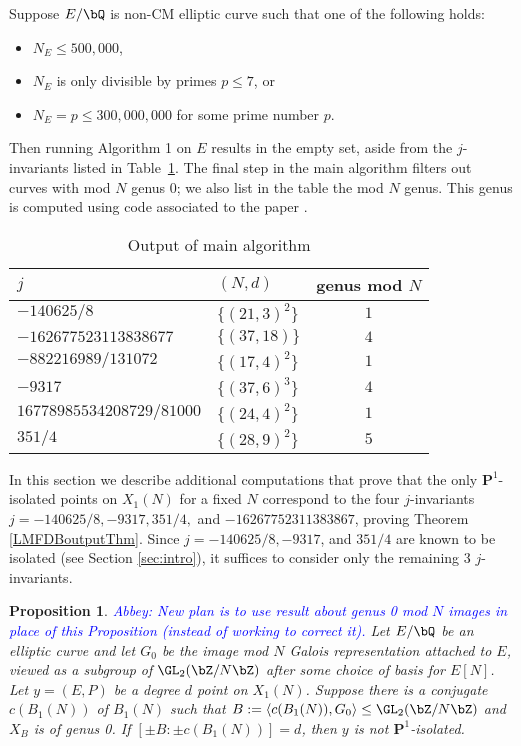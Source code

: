 \documentclass[11pt,reqno]{amsart}
\theoremstyle{plain}
\newtheorem{proposition}[theorem]{Proposition}
\theoremstyle{definition}
\newcommand{\Q}{\bQ}
\newcommand{\Z}{\bZ}
\newcommand{\PP}{\mathbf P}
\newcommand{\abbey}[1]{\textcolor{blue}{Abbey: #1}}
\begin{document}
Suppose $E/\Q$ is non-CM elliptic curve such that one of the following holds:
\begin{itemize}
    \item$N_E \leq 500{,}000$,
    \item $N_E$ is only divisible by primes $p \leq 7$, or
    \item $N_E=p \leq 300{,}000{,}000$ for some prime number $p$.
\end{itemize} Then running Algorithm 1 on $E$ results in the empty set, aside from the $j$-invariants listed in Table~\ref{table:imagegt0}. The final step in the main algorithm filters out curves with mod $N$ genus $0$; we also list in the table the mod $N$ genus.  This genus is computed using code associated to the paper \cite{RSZB2022}. 
	\begin{table}[h]
	\begin{center}
		\begin{tabularx}{266pt}{l l c} \toprule
		$j$ & $( N, d )$ & genus mod $N$  \\\midrule
$-140625/8$ &  $\{ ( 21, 3 )^2 \} $ & $1$\\
 $-162677523113838677$& $\{ ( 37, 18 ) \}$ & $4$\\
 $-882216989/131072$ & $\{ ( 17, 4 )^2\}$ & $1$ \\
 $-9317$ & $\{ ( 37, 6 )^3 \} $ & $4$\\
 $16778985534208729/81000$ & $\{ ( 24, 4 )^2 \}$ & $1$\\
 $351/4$ & $\{ ( 28, 9 )^2 \}$ & $5$\\ \bottomrule
		\end{tabularx}
		\caption{Output of main algorithm}\label{table:imagegt0}
	\end{center}
\end{table}

In this section we describe additional computations that prove that the only $\PP^1$-isolated points on $X_1(N)$ for a fixed $N$ correspond to the four $j$-invariants $j=-140625/8,-9317,351/4,$ and $ -16267752311383867$, proving Theorem \ref{LMFDBoutputThm}. Since $j=-140625/8,-9317$, and $351/4$ are known to be isolated (see Section \ref{sec:intro}), it suffices to consider only the remaining 3 $j$-invariants.
\begin{proposition} \abbey{New plan is to use result about genus 0 mod $N$ images in place of this Proposition (instead of working to correct it).}
    Let $E/\Q$ be an elliptic curve and let $G_0$ be the image mod $N$ Galois representation attached to $E$, viewed as a subgroup of $\GL_2(\Z/N\Z)$ after some choice of basis for $E[N]$. Let $y=(E,P)$ be a degree $d$ point on $X_1(N)$. Suppose there is a conjugate $c(B_1(N))$ of $B_1(N)$ such that $B:=\langle c(B_1(N)), G_0 \rangle \leq \GL_2(\Z/N\Z)$ and $X_B$ is of genus 0. If $[\pm B: \pm c(B_1(N))]=d$, then $y$ is not $\PP^1$-isolated.
\end{proposition}
\end{document}
